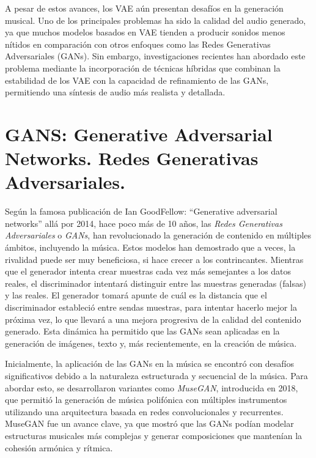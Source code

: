 A pesar de estos avances, los VAE aún presentan desafíos en la generación musical. Uno de los principales problemas ha sido la calidad del audio generado, ya que muchos modelos basados en VAE tienden a producir sonidos menos nítidos en comparación con otros enfoques como las Redes Generativas Adversariales (GANs). Sin embargo, investigaciones recientes han abordado este problema mediante la incorporación de técnicas híbridas que combinan la estabilidad de los VAE con la capacidad de refinamiento de las GANs, permitiendo una síntesis de audio más realista y detallada.


\section {GANS: Generative Adversarial Networks. Redes Generativas Adversariales.}

Según la famosa publicación de Ian GoodFellow: ``Generative adversarial networks''\citep{goodfellow2014gan} allá por 2014, hace poco más de 10 años, las \emph{Redes Generativas Adversariales} o \emph{GANs}, han revolucionado la generación de contenido en múltiples ámbitos, incluyendo la música. Estos modelos han demostrado que a veces, la rivalidad puede ser muy beneficiosa, si hace crecer a los contrincantes. Mientras que el generador intenta crear muestras cada vez más semejantes a los datos reales, el discriminador intentará distinguir entre las muestras generadas (falsas) y las reales. El generador tomará apunte de cuál es la distancia que el discriminador estableció entre sendas muestras, para intentar hacerlo mejor la próxima vez, lo que llevará a una mejora progresiva de la calidad del contenido generado. Esta dinámica ha permitido que las GANs sean aplicadas en la generación de imágenes, texto y, más recientemente, en la creación de música.

Inicialmente, la aplicación de las GANs en la música se encontró con desafíos significativos debido a la naturaleza estructurada y secuencial de la música. Para abordar esto, se desarrollaron variantes como \emph{MuseGAN}, introducida en 2018, que permitió la generación de música polifónica con múltiples instrumentos utilizando una arquitectura basada en redes convolucionales y recurrentes. MuseGAN fue un avance clave, ya que mostró que las GANs podían modelar estructuras musicales más complejas y generar composiciones que mantenían la cohesión armónica y rítmica.

